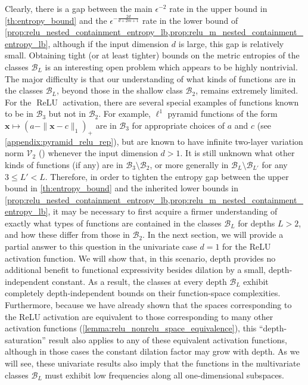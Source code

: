 \documentclass{article}
\DeclareMathOperator{\ReLU}{\mathrm{ReLU}}
\def\vx{{\bm{x}}}
\def\cB{{\mathcal{B}}}
\def\cV{{\mathcal{V}}}
\begin{document}
Clearly, there is a gap between the main $\epsilon^{-2}$ rate in the upper bound in \cref{th:entropy_bound} and the $\epsilon^{-\frac{2d}{d+2m+1}}$ rate in the lower bound of \cref{prop:relu_nested_containment_entropy_lb,prop:relu_m_nested_containment_entropy_lb}, although if the input dimension $d$ is large, this gap is relatively small. Obtaining tight (or at least tighter) bounds on the metric entropies of the classes $\cB_L$ is an interesting open problem which appears to be highly nontrivial. The major difficulty is that our understanding of what kinds of functions are in the classes $\cB_L$, beyond those in the shallow class $\cB_2$, remains extremely limited. For the $\ReLU$ activation, there are several special examples of functions known to be in $\cB_3$ but not in $\cB_2$. For example, $\ell^1$ pyramid functions of the form $\vx \mapsto (a - \| \vx - c \|_1)_+$ are in $\cB_3$ for appropriate choices of $a$ and $c$ (see \cref{appendix:pyramid_relu_rep}), but are known to have infinite two-layer variation norm $\cV_2$ (\cite{ongie2019function}) whenever the input dimension $d > 1$. It is still unknown what other kinds of functions (if any) are in $\cB_3 \setminus \cB_2$, or more generally in $\cB_L \setminus \cB_{L'}$ for any $3 \leq L' < L$. Therefore, in order to tighten the entropy gap between the upper bound in \cref{th:entropy_bound} and the inherited lower bounds in \cref{prop:relu_nested_containment_entropy_lb,prop:relu_m_nested_containment_entropy_lb}, it may be necessary to first acquire a firmer understanding of exactly what types of functions are contained in the classes $\cB_L$ for depths $L > 2$, and how these differ from those in $\cB_2$. In the next section, we will provide a partial answer to this question in the univariate case $d=1$ for the ReLU activation function. We will show that, in this scenario, depth provides no additional benefit to functional expressivity besides dilation by a small, depth-independent constant. As a result, the classes at every depth $\cB_L$ exhibit completely depth-independent bounds on their function-space complexities. Furthermore, because we have already shown that the spaces corresponding to the ReLU activation are equivalent to those corresponding to many other activation functions (\cref{lemma:relu_nonrelu_space_equivalence}), this ``depth-saturation'' result also applies to any of these equivalent activation functions, although in those cases the constant dilation factor may grow with depth. As we will see, these univariate results also imply that the functions in the multivariate classes $\cB_L$ must exhibit low frequencies along all one-dimensional subspaces.
\end{document}
